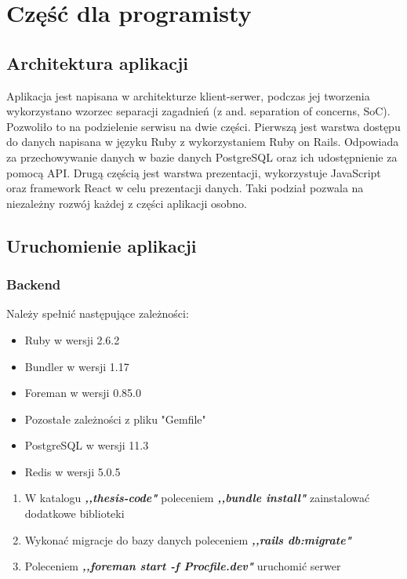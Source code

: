 \documentclass[declaration,shortabstract]{iithesis}
\begin{document}
\chapter{Część dla programisty}
\section{Architektura aplikacji}
Aplikacja jest napisana w architekturze klient-serwer, podczas jej tworzenia wykorzystano wzorzec separacji  zagadnień (z and. separation of concerns, SoC). Pozwoliło to na podzielenie serwisu na dwie części. Pierwszą jest warstwa dostępu do danych napisana w języku Ruby z wykorzystaniem Ruby on Rails. Odpowiada za przechowywanie danych w bazie danych PostgreSQL oraz ich udostępnienie za pomocą API. Drugą częścią jest warstwa prezentacji, wykorzystuje JavaScript oraz framework React w celu prezentacji danych. Taki podział pozwala na niezależny rozwój każdej z części aplikacji osobno.

\section{Uruchomienie aplikacji}

\subsection{Backend}
Należy spełnić następujące zależności:
        \begin{itemize}
            \item Ruby w wersji 2.6.2
            \item Bundler w wersji 1.17
            \item Foreman w wersji 0.85.0
            \item Pozostałe zależności z pliku "Gemfile"
            \item PostgreSQL w wersji 11.3
            \item Redis w wersji 5.0.5
        \end{itemize}

\begin{enumerate}
    \item W katalogu \textbf{\textit{,,thesis-code"}} poleceniem \textbf{\textit{,,bundle install"}} zainstalować dodatkowe biblioteki
    \item Wykonać migracje do bazy danych poleceniem \textbf{\textit{,,rails db:migrate"}}
    \item Poleceniem \textbf{\textit{,,foreman start -f Procfile.dev"}} uruchomić serwer
\end{enumerate}
\end{document}
